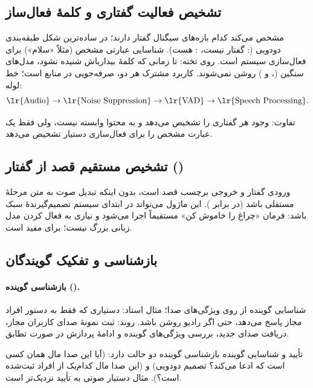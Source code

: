 \subsection{تشخیص فعالیت گفتاری و کلمهٔ فعال‌ساز}
 مشخص می‌کند کدام بازه‌های سیگنال گفتار دارند؛ در ساده‌ترین شکل طبقه‌بندی دودویی (: گفتار نیست، : هست).  شناسایی عبارتی مشخص (مثلاً «سلام») برای فعال‌سازی سیستم است. روی تخته: تا زمانی که کلمهٔ بیدارباش شنیده نشود، مدل‌های سنگین (،  و ) روشن نمی‌شوند. کاربرد مشترک هر دو، صرفه‌جویی در منابع است؛ خط لوله:
\[
\text{\lr{Audio}}\rightarrow\text{\lr{Noise Suppression}}\rightarrow\text{\lr{VAD}}\rightarrow\text{\lr{Speech Processing}}.
\]

تفاوت:  وجود هر گفتاری را تشخیص می‌دهد و به محتوا وابسته نیست، ولی  فقط یک عبارت مشخص را برای فعال‌سازی دستیار تشخیص می‌دهد.

\subsection{تشخیص مستقیم قصد از گفتار ()}
ورودی گفتار و خروجی برچسب قصد است، بدون اینکه تبدیل صوت به متن مرحلهٔ مستقلی باشد (در برابر ). این ماژول می‌تواند در ابتدای سیستم تصمیم‌گیرندهٔ سبک باشد: فرمان «چراغ را خاموش کن» مستقیماً اجرا می‌شود و نیازی به فعال کردن مدل زبانی بزرگ نیست؛ برای  مفید است.

\subsection{بازشناسی و تفکیک گویندگان}
\paragraph{بازشناسی گوینده ().} شناسایی گوینده از روی ویژگی‌های صدا؛ مثال استاد: دستیاری که فقط به دستور افراد مجاز پاسخ می‌دهد، حتی اگر رادیو روشن باشد. روند: ثبت نمونهٔ صدای کاربران مجاز، دریافت صدای جدید، بررسی ویژگی‌های گوینده و ادامهٔ پردازش در صورت تطابق.

\begin{correctionbox}{تأیید و شناسایی گوینده}
بازشناسی گوینده دو حالت دارد:  (آیا این صدا مال همان کسی است که ادعا می‌کند؟ تصمیم دودویی) و  (این صدا مال کدام‌یک از افراد ثبت‌شده است؟). مثال دستیار صوتی به تأیید نزدیک‌تر است.
\end{correctionbox}

